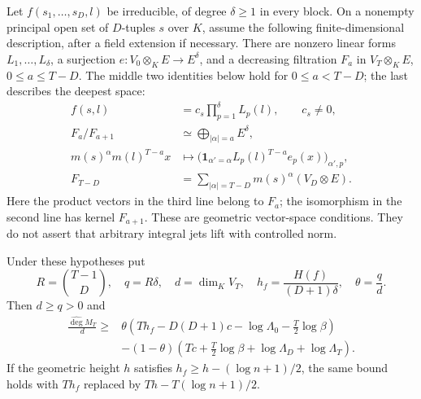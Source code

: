 Let $f(s_1,\ldots,s_D,l)$ be irreducible, of degree $\delta\geq1$
in every block.  On a nonempty principal open set of $D$-tuples $s$
over $K$, assume the following finite-dimensional description, after
a field extension if necessary.  There are nonzero linear forms
$L_1,\ldots,L_\delta$, a surjection
$e:V_0\otimes_K E\to E^\delta$, and a decreasing filtration $F_a$ in $V_T\otimes_K E$,
$0\leq a\leq T-D$.  The middle two identities below hold for
$0\leq a<T-D$; the last describes the deepest space:
\begin{equation}\label{eq:arithmetic-generic-filtration}
 \begin{split}
 f(s,l)&=c_s\prod_{p=1}^{\delta}L_p(l),\qquad c_s\ne0,\\
 F_a/F_{a+1}&\simeq\bigoplus_{|\alpha|=a}E^\delta,\\
 m(s)^\alpha m(l)^{T-a}x&\longmapsto
           \bigl(\mathbf1_{\alpha'=\alpha}L_p(l)^{T-a}e_p(x)\bigr)_{\alpha',p},\\
 F_{T-D}&=\sum_{|\alpha|=T-D}m(s)^\alpha(V_D\otimes E).
 \end{split}
\end{equation}
Here the product vectors in the third line belong to $F_a$; the
isomorphism in the second line has kernel $F_{a+1}$.  These are
geometric vector-space conditions.  They do not assert that arbitrary
integral jets lift with controlled norm.

\begin{theorem}\label{thm:arithmetic-determinant-degree}
Under these hypotheses put
\[
 R=\binom{T-1}{D},\quad q=R\delta,\quad d=\dim_KV_T,\quad
 h_f=\frac{H(f)}{(D+1)\delta},\quad\theta=\frac qd.
\]
Then $d\geq q>0$ and
\begin{equation}\label{eq:arithmetic-determinant-slope}
 \begin{split}
 \frac{\widehat{\deg}M_T}{d}\geq{}&
 \theta\left(Th_f-D(D+1)c-\log\Lambda_0-\frac T2\log\beta\right)\\
 &-(1-\theta)\left(Tc+\frac T2\log\beta
                          +\log\Lambda_D+\log\Lambda_T\right).
 \end{split}
\end{equation}
If the geometric height $h$ satisfies
$h_f\geq h-(\log n+1)/2$, the same bound holds with $Th_f$ replaced
by $Th-T(\log n+1)/2$.
\end{theorem}

